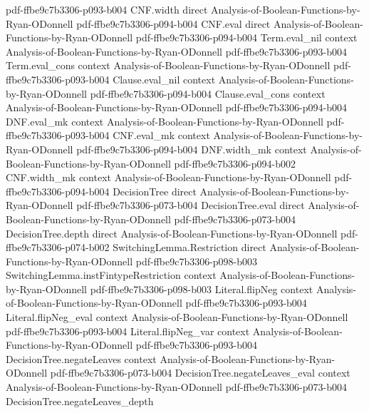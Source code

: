 \begin{theorem}
  {pdf-ffbe9c7b3306-p093-b004}
\proofstep
  {CNF.width}
  {direct}
  {Analysis-of-Boolean-Functions-by-Ryan-ODonnell}
  {pdf-ffbe9c7b3306-p094-b004}
\proofstep
  {CNF.eval}
  {direct}
  {Analysis-of-Boolean-Functions-by-Ryan-ODonnell}
  {pdf-ffbe9c7b3306-p094-b004}
\proofstep
  {Term.eval_nil}
  {context}
  {Analysis-of-Boolean-Functions-by-Ryan-ODonnell}
  {pdf-ffbe9c7b3306-p093-b004}
\proofstep
  {Term.eval_cons}
  {context}
  {Analysis-of-Boolean-Functions-by-Ryan-ODonnell}
  {pdf-ffbe9c7b3306-p093-b004}
\proofstep
  {Clause.eval_nil}
  {context}
  {Analysis-of-Boolean-Functions-by-Ryan-ODonnell}
  {pdf-ffbe9c7b3306-p094-b004}
\proofstep
  {Clause.eval_cons}
  {context}
  {Analysis-of-Boolean-Functions-by-Ryan-ODonnell}
  {pdf-ffbe9c7b3306-p094-b004}
\proofstep
  {DNF.eval_mk}
  {context}
  {Analysis-of-Boolean-Functions-by-Ryan-ODonnell}
  {pdf-ffbe9c7b3306-p093-b004}
\proofstep
  {CNF.eval_mk}
  {context}
  {Analysis-of-Boolean-Functions-by-Ryan-ODonnell}
  {pdf-ffbe9c7b3306-p094-b004}
\proofstep
  {DNF.width_mk}
  {context}
  {Analysis-of-Boolean-Functions-by-Ryan-ODonnell}
  {pdf-ffbe9c7b3306-p094-b002}
\proofstep
  {CNF.width_mk}
  {context}
  {Analysis-of-Boolean-Functions-by-Ryan-ODonnell}
  {pdf-ffbe9c7b3306-p094-b004}
\proofstep
  {DecisionTree}
  {direct}
  {Analysis-of-Boolean-Functions-by-Ryan-ODonnell}
  {pdf-ffbe9c7b3306-p073-b004}
\proofstep
  {DecisionTree.eval}
  {direct}
  {Analysis-of-Boolean-Functions-by-Ryan-ODonnell}
  {pdf-ffbe9c7b3306-p073-b004}
\proofstep
  {DecisionTree.depth}
  {direct}
  {Analysis-of-Boolean-Functions-by-Ryan-ODonnell}
  {pdf-ffbe9c7b3306-p074-b002}
\proofstep
  {SwitchingLemma.Restriction}
  {direct}
  {Analysis-of-Boolean-Functions-by-Ryan-ODonnell}
  {pdf-ffbe9c7b3306-p098-b003}
\proofstep
  {SwitchingLemma.instFintypeRestriction}
  {context}
  {Analysis-of-Boolean-Functions-by-Ryan-ODonnell}
  {pdf-ffbe9c7b3306-p098-b003}
\proofstep
  {Literal.flipNeg}
  {context}
  {Analysis-of-Boolean-Functions-by-Ryan-ODonnell}
  {pdf-ffbe9c7b3306-p093-b004}
\proofstep
  {Literal.flipNeg_eval}
  {context}
  {Analysis-of-Boolean-Functions-by-Ryan-ODonnell}
  {pdf-ffbe9c7b3306-p093-b004}
\proofstep
  {Literal.flipNeg_var}
  {context}
  {Analysis-of-Boolean-Functions-by-Ryan-ODonnell}
  {pdf-ffbe9c7b3306-p093-b004}
\proofstep
  {DecisionTree.negateLeaves}
  {context}
  {Analysis-of-Boolean-Functions-by-Ryan-ODonnell}
  {pdf-ffbe9c7b3306-p073-b004}
\proofstep
  {DecisionTree.negateLeaves_eval}
  {context}
  {Analysis-of-Boolean-Functions-by-Ryan-ODonnell}
  {pdf-ffbe9c7b3306-p073-b004}
\proofstep
  {DecisionTree.negateLeaves_depth}

\end{theorem}
